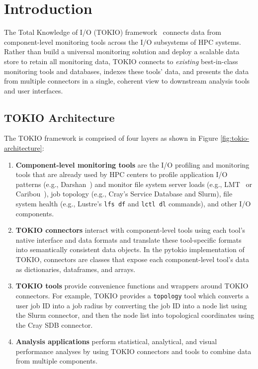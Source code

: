 \section{Introduction}

The Total Knowledge of I/O (TOKIO) framework~\cite{Lockwood2017} connects data from component-level monitoring tools across the I/O subsystems of HPC systems.  Rather than build a universal monitoring solution and deploy a scalable data store to retain all monitoring data, TOKIO connects to \emph{existing} best-in-class monitoring tools and databases, indexes these tools' data, and presents the data from multiple connectors in a single, coherent view to downstream analysis tools and user interfaces.

\subsection{TOKIO Architecture}

The TOKIO framework is comprised of four layers as shown in Figure \ref{fig:tokio-architecture}:

\begin{enumerate}
\item \textbf{Component-level monitoring tools} are the I/O profiling and monitoring tools that are already used by HPC centers to profile application I/O patterns (e.g., Darshan~\cite{Carns2009}) and monitor file system server loads (e.g., LMT~\cite{Keopp2014} or Caribou~\cite{Flaskerud2017}), job topology (e.g., Cray's Service Database and Slurm), file system health (e.g., Lustre's \texttt{lfs df} and \texttt{lctl dl} commands), and other I/O components.
\item \textbf{TOKIO connectors} interact with component-level tools using each tool's native interface and data formats and translate these tool-specific formats into semantically consistent data objects.  In the pytokio implementation of TOKIO, connectors are classes that expose each component-level tool's data as dictionaries, dataframes, and arrays.
\item \textbf{TOKIO tools} provide convenience functions and wrappers around TOKIO connectors.  For example, TOKIO provides a \texttt{topology} tool which converts a user job ID into a job radius by converting the job ID into a node list using the Slurm connector, and then the node list into topological coordinates using the Cray SDB connector.
\item \textbf{Analysis applications} perform statistical, analytical, and visual performance analyses by using TOKIO connectors and tools to combine data from multiple components.
\end{enumerate}

